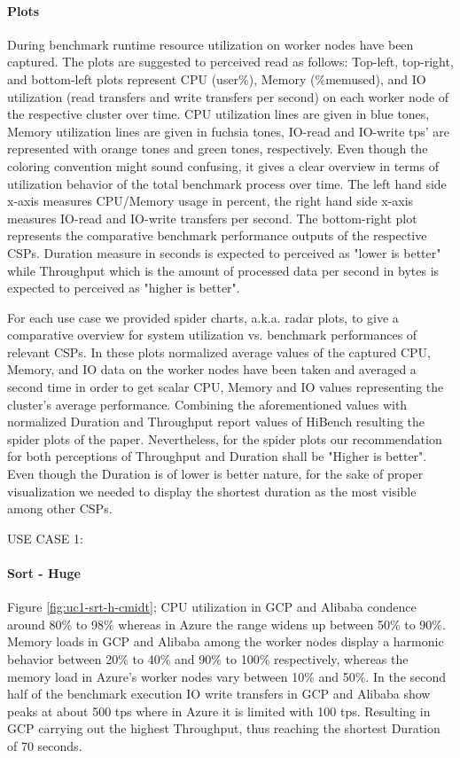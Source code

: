 \documentclass[review]{elsarticle}
\begin{document}
\paragraph{Plots}During benchmark runtime resource utilization on worker nodes have been captured. The plots are suggested to perceived read as follows: Top-left, top-right, and bottom-left plots represent CPU (user\%), Memory (\%memused), and IO utilization (read transfers and write transfers per second) on each worker node of the respective cluster over time. CPU utilization lines are given in blue tones, Memory utilization lines are given in fuchsia tones, IO-read and IO-write tps' are represented with orange tones and green tones, respectively. Even though the coloring convention might sound confusing, it gives a clear overview in terms of utilization behavior of the total benchmark process over time. The left hand side x-axis measures CPU/Memory usage in percent, the right hand side x-axis measures IO-read and IO-write transfers per second. The bottom-right plot represents the comparative benchmark performance outputs of the respective CSPs. Duration measure in seconds is expected to perceived as "lower is better" while Throughput which is the amount of processed data per second in bytes is expected to perceived as "higher is better".

For each use case we provided spider charts, a.k.a. radar plots, to give a comparative overview for system utilization vs. benchmark performances of relevant CSPs. In these plots normalized average values of the captured CPU, Memory, and IO data on the worker nodes have been taken and averaged a second time in order to get scalar CPU, Memory and IO values representing the cluster's average performance. Combining the aforementioned values with normalized Duration and Throughput report values of HiBench resulting the spider plots of the paper. Nevertheless, for the spider plots our recommendation for both perceptions of Throughput and Duration shall be "Higher is better". Even though the Duration is of lower is better nature, for the sake of proper visualization we needed to display the shortest duration as the most visible among other CSPs.





USE CASE 1: 

\paragraph{Sort - Huge} Figure \ref{fig:uc1-srt-h-cmidt}; CPU utilization in GCP and Alibaba condence around 80\% to 98\% whereas in Azure the range widens up between 50\% to 90\%. Memory loads in GCP and Alibaba among the worker nodes display a harmonic behavior between 20\% to 40\% and 90\% to 100\% respectively, whereas the memory load in Azure's worker nodes vary between 10\% and 50\%. In the second half of the benchmark execution IO write transfers in GCP and Alibaba show peaks at about 500 tps where in Azure it is limited with 100 tps. Resulting in GCP carrying out the highest Throughput, thus reaching the shortest Duration of 70 seconds.
\end{document}

